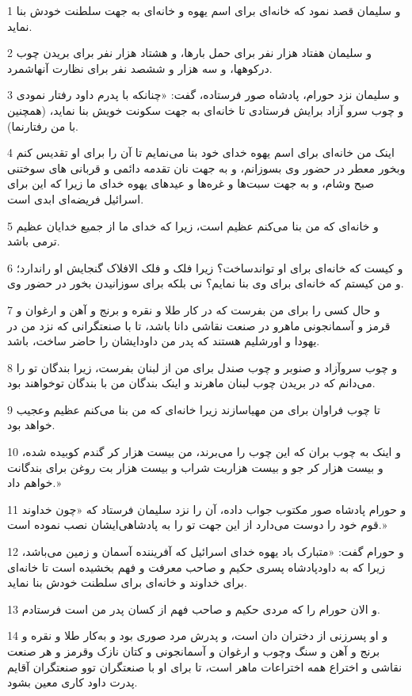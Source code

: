 \par 1 و سلیمان قصد نمود که خانه‌ای برای اسم یهوه و خانه‌ای به جهت سلطنت خودش بنا نماید.
\par 2 و سلیمان هفتاد هزار نفر برای حمل بارها، و هشتاد هزار نفر برای بریدن چوب درکوهها، و سه هزار و ششصد نفر برای نظارت آنهاشمرد.
\par 3 و سلیمان نزد حورام، پادشاه صور فرستاده، گفت: «چنانکه با پدرم داود رفتار نمودی و چوب سرو آزاد برایش فرستادی تا خانه‌ای به جهت سکونت خویش بنا نماید، (همچنین با من رفتارنما).
\par 4 اینک من خانه‌ای برای اسم یهوه خدای خود بنا می‌نمایم تا آن را برای او تقدیس کنم وبخور معطر در حضور وی بسوزانم، و به جهت نان تقدمه دائمی و قربانی های سوختنی صبح وشام، و به جهت سبت‌ها و غره‌ها و عیدهای یهوه خدای ما زیرا که این برای اسرائیل فریضه‌ای ابدی است.
\par 5 و خانه‌ای که من بنا می‌کنم عظیم است، زیرا که خدای ما از جمیع خدایان عظیم ترمی باشد.
\par 6 و کیست که خانه‌ای برای او تواندساخت؟ زیرا فلک و فلک الافلاک گنجایش او راندارد؛ و من کیستم که خانه‌ای برای وی بنا نمایم؟ نی بلکه برای سوزانیدن بخور در حضور وی.
\par 7 و حال کسی را برای من بفرست که در کار طلا و نقره و برنج و آهن و ارغوان و قرمز و آسمانجونی ماهرو در صنعت نقاشی دانا باشد، تا با صنعتگرانی که نزد من در یهودا و اورشلیم هستند که پدر من داودایشان را حاضر ساخت، باشد.
\par 8 و چوب سروآزاد و صنوبر و چوب صندل برای من از لبنان بفرست، زیرا بندگان تو را می‌دانم که در بریدن چوب لبنان ماهرند و اینک بندگان من با بندگان توخواهند بود.
\par 9 تا چوب فراوان برای من مهیاسازند زیرا خانه‌ای که من بنا می‌کنم عظیم وعجیب خواهد بود.
\par 10 و اینک به چوب بران که این چوب را می‌برند، من بیست هزار کر گندم کوبیده شده، و بیست هزار کر جو و بیست هزاربت شراب و بیست هزار بت روغن برای بندگانت خواهم داد.»
\par 11 و حورام پادشاه صور مکتوب جواب داده، آن را نزد سلیمان فرستاد که «چون خداوند قوم خود را دوست می‌دارد از این جهت تو را به پادشاهی‌ایشان نصب نموده است.»
\par 12 و حورام گفت: «متبارک باد یهوه خدای اسرائیل که آفریننده آسمان و زمین می‌باشد، زیرا که به داودپادشاه پسری حکیم و صاحب معرفت و فهم بخشیده است تا خانه‌ای برای خداوند و خانه‌ای برای سلطنت خودش بنا نماید.
\par 13 و الان حورام را که مردی حکیم و صاحب فهم از کسان پدر من است فرستادم.
\par 14 و او پسرزنی از دختران دان است، و پدرش مرد صوری بود و به‌کار طلا و نقره و برنج و آهن و سنگ وچوب و ارغوان و آسمانجونی و کتان نازک وقرمز و هر صنعت نقاشی و اختراع همه اختراعات ماهر است، تا برای او با صنعتگران توو صنعتگران آقایم پدرت داود کاری معین بشود.
